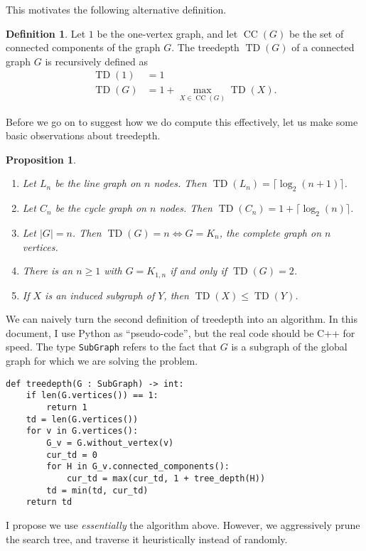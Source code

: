 \documentclass{article}
\newtheorem{proposition}{Proposition}
\theoremstyle{definition}
\newtheorem{definition}{Definition}
\DeclareMathOperator{\TD}{TD}
\DeclareMathOperator{\CC}{CC}
\begin{document}
This motivates the following alternative definition.
\begin{definition}
    Let $1$ be the one-vertex graph, and let $\CC(G)$ be the set of connected components of
    the graph $G$. The treedepth $\TD(G)$ of a connected graph $G$ is recursively defined as
    \begin{align*}
        \TD(1) &= 1 \\
        \TD(G) &= 1 + \max_{X \in \CC(G)} \TD(X).
    \end{align*}
\end{definition}
Before we go on to suggest how we do compute this effectively, let us make some
basic observations about treedepth.
\begin{proposition}~
    \begin{enumerate}
        \item Let $L_n$ be the line graph on $n$ nodes. Then $\TD(L_n) =
            \lceil\log_2(n+1)\rceil$.
        \item Let $C_n$ be the cycle graph on $n$ nodes. Then $\TD(C_n) = 1 +
            \lceil\log_2(n)\rceil$.
        \item Let $|G| = n$. Then $\TD(G) = n \iff G = K_n$, the complete graph on $n$
            vertices.
        \item There is an $n \geq 1$ with $G = K_{1,n}$ if and only if $\TD(G) =
            2$.
        \item If $X$ is an induced subgraph of $Y$, then $\TD(X) \leq \TD(Y)$.
    \end{enumerate}
\end{proposition}
We can naively turn the second definition of treedepth into an algorithm. In
this document, I use Python as ``pseudo-code'', but the real code should be C++
for speed. The type \texttt{SubGraph} refers to the fact that $G$ is a subgraph
of the global graph for which we are solving the problem.
\begin{verbatim}
def treedepth(G : SubGraph) -> int:
    if len(G.vertices()) == 1:
        return 1
    td = len(G.vertices())
    for v in G.vertices():
        G_v = G.without_vertex(v)
        cur_td = 0
        for H in G_v.connected_components():
            cur_td = max(cur_td, 1 + tree_depth(H))
        td = min(td, cur_td)
    return td
\end{verbatim}
I propose we use \emph{essentially} the algorithm above. However, we
aggressively prune the search tree, and traverse it heuristically instead of
randomly.
\end{document}
